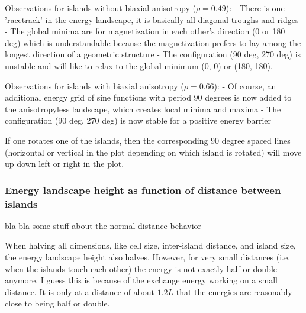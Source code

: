 \documentclass[12pt,a4paper]{article}
\begin{document}
Observations for islands without biaxial anisotropy ($\rho = 0.49$):
- There is one 'racetrack' in the energy landscape, it is basically all diagonal troughs and ridges
- The global minima are for magnetization in each other's direction (0 or 180 deg) which is understandable because the magnetization prefers to lay among the longest direction of a geometric structure
- The configuration (90 deg, 270 deg) is unstable and will like to relax to the global minimum (0, 0) or (180, 180).

Observations for islands with biaxial anisotropy ($\rho = 0.66$):
- Of course, an additional energy grid of sine functions with period 90 degrees is now added to the anisotropyless landscape, which creates local minima and maxima
- The configuration (90 deg, 270 deg) is now stable for a positive energy barrier

If one rotates one of the islands, then the corresponding 90 degree spaced lines (horizontal or vertical in the plot depending on which island is rotated) will move up down left or right in the plot.

\subsubsection{Energy landscape height as function of distance between islands}
bla bla some stuff about the normal distance behavior

When halving all dimensions, like cell size, inter-island distance, and island size, the energy landscape height also halves. However, for very small distances (i.e. when the islands touch each other) the energy is not exactly half or double anymore. I guess this is because of the exchange energy working on a small distance. It is only at a distance of about $1.2 L$ that the energies are reasonably close to being half or double.


\newpage


\end{document}
